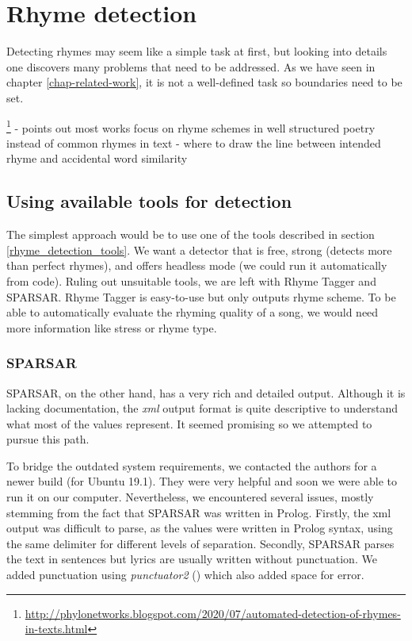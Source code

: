 
\chapter{Rhyme detection}
Detecting rhymes may seem like a simple task at first, but looking into details one discovers many problems that need to be addressed. As we have seen in chapter \ref{chap-related-work}, it is not a well-defined task so boundaries need to be set.


\footnote{\url{http://phylonetworks.blogspot.com/2020/07/automated-detection-of-rhymes-in-texts.html}}
- points out most works focus on rhyme schemes in well structured poetry instead of common rhymes in text
- where to draw the line between intended rhyme and accidental word similarity

\section{Using available tools for detection}
The simplest approach would be to use one of the tools described in section \ref{rhyme_detection_tools}. We want a detector that is free, strong (detects more than perfect rhymes), and offers headless mode (we could run it automatically from code). Ruling out unsuitable tools, we are left with Rhyme Tagger and SPARSAR. Rhyme Tagger is easy-to-use but only outputs rhyme scheme. To be able to automatically evaluate the rhyming quality of a song, we would need more information like stress or rhyme type.

\subsection*{SPARSAR}
SPARSAR, on the other hand, has a very rich and detailed output. Although it is lacking documentation, the \textit{xml} output format is quite descriptive to understand what most of the values represent. It seemed promising so we attempted to pursue this path.

To bridge the outdated system requirements, we contacted the authors for a newer build (for Ubuntu 19.1). They were very helpful and soon we were able to run it on our computer. Nevertheless, we encountered several issues, mostly stemming from the fact that SPARSAR was written in Prolog. Firstly, the xml output was difficult to parse, as the values were written in Prolog syntax, using the same delimiter for different levels of separation. Secondly, SPARSAR parses the text in sentences but lyrics are usually written without punctuation. We added punctuation using \textit{punctuator2} (\cite{tilk2016punctuation}) which also added space for error. 

